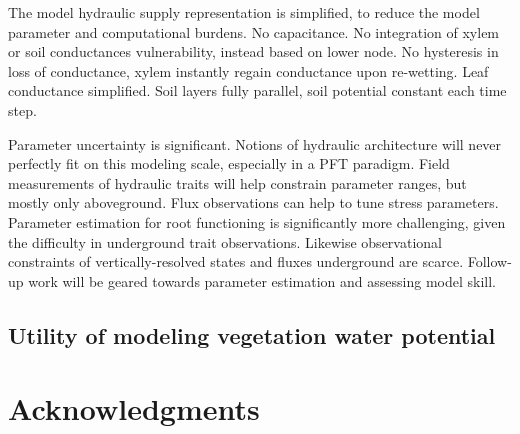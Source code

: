 \documentclass[draft,linenumbers]{agujournal}
\begin{document}
    The model hydraulic supply representation is simplified, to reduce the model parameter and computational burdens.
    No capacitance.
    No integration of xylem or soil conductances vulnerability, instead based on lower node.
    No hysteresis in loss of conductance, xylem instantly regain conductance upon re-wetting.
    Leaf conductance simplified.
    Soil layers fully parallel, soil potential constant each time step.
    
    Parameter uncertainty is significant.
    Notions of hydraulic architecture will never perfectly fit on this modeling scale, especially in a PFT paradigm.
    Field measurements of hydraulic traits will help constrain parameter ranges, but mostly only aboveground.
    Flux observations can help to tune stress parameters.
    Parameter estimation for root functioning is significantly more challenging, given the difficulty in underground trait observations.
    Likewise observational constraints of vertically-resolved states and fluxes underground are scarce.
    Follow-up work will be geared towards parameter estimation and assessing model skill.

\subsection{Utility of modeling vegetation water potential}

\section{Acknowledgments}

\clearpage    
\end{document}
